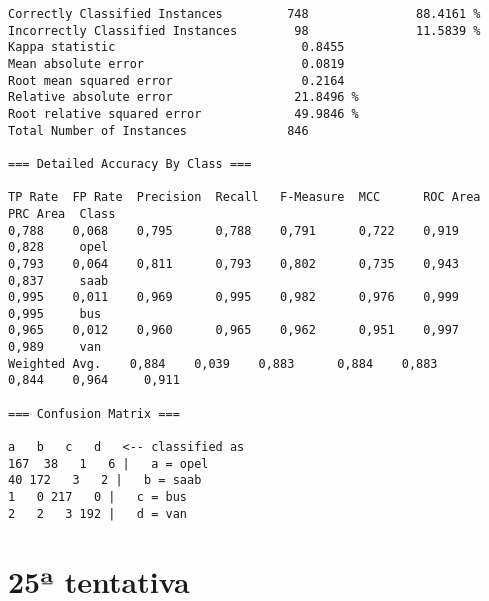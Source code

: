 \documentclass[
	article,			%
	11pt,				%
	oneside,			%
	a4paper,			%
	english,			%
	brazil,				%
	sumario=tradicional
	]{abntex2}
\begin{document}
\begin{lstlisting}
Correctly Classified Instances         748               88.4161 %
Incorrectly Classified Instances        98               11.5839 %
Kappa statistic                          0.8455
Mean absolute error                      0.0819
Root mean squared error                  0.2164
Relative absolute error                 21.8496 %
Root relative squared error             49.9846 %
Total Number of Instances              846     

=== Detailed Accuracy By Class ===

TP Rate  FP Rate  Precision  Recall   F-Measure  MCC      ROC Area  PRC Area  Class
0,788    0,068    0,795      0,788    0,791      0,722    0,919     0,828     opel
0,793    0,064    0,811      0,793    0,802      0,735    0,943     0,837     saab
0,995    0,011    0,969      0,995    0,982      0,976    0,999     0,995     bus
0,965    0,012    0,960      0,965    0,962      0,951    0,997     0,989     van
Weighted Avg.    0,884    0,039    0,883      0,884    0,883      0,844    0,964     0,911     

=== Confusion Matrix ===

a   b   c   d   <-- classified as
167  38   1   6 |   a = opel
40 172   3   2 |   b = saab
1   0 217   0 |   c = bus
2   2   3 192 |   d = van

\end{lstlisting}

\section{25ª tentativa}
\end{document}
